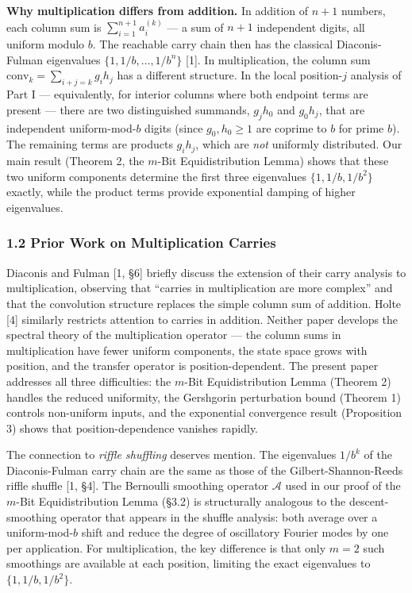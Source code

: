 \documentclass[
  11pt,
]{article}
\begin{document}
\textbf{Why multiplication differs from addition.} In addition of \(n+1\)
numbers, each column sum is \(\sum_{i=1}^{n+1} a_i^{(k)}\) --- a sum of \(n+1\)
independent digits, all uniform modulo \(b\). The reachable carry chain then has
the classical Diaconis-Fulman eigenvalues
\(\lbrace{}1, 1/b, \ldots, 1/b^n\rbrace{}\) {[}1{]}. In multiplication, the
column sum \(\text{conv}_k = \sum_{i+j=k} g_i h_j\) has a different structure.
In the local position-\(j\) analysis of Part I --- equivalently, for interior
columns where both endpoint terms are present --- there are two distinguished
summands, \(g_j h_0\) and \(g_0 h_j\), that are independent uniform-mod-\(b\)
digits (since \(g_0, h_0 \geq 1\) are coprime to \(b\) for prime \(b\)). The
remaining terms are products \(g_i h_j\), which are \emph{not} uniformly
distributed. Our main result (Theorem 2, the \(m\)-Bit Equidistribution Lemma)
shows that these two uniform components determine the first three eigenvalues
\(\lbrace{}1, 1/b, 1/b^2\rbrace{}\) exactly, while the product terms provide
exponential damping of higher eigenvalues.

\subsubsection{1.2 Prior Work on Multiplication
Carries}\label{prior-work-on-multiplication-carries}

Diaconis and Fulman {[}1, §6{]} briefly discuss the extension of their carry
analysis to multiplication, observing that ``carries in multiplication are more
complex'' and that the convolution structure replaces the simple column sum of
addition. Holte {[}4{]} similarly restricts attention to carries in addition.
Neither paper develops the spectral theory of the multiplication operator ---
the column sums in multiplication have fewer uniform components, the state space
grows with position, and the transfer operator is position-dependent. The
present paper addresses all three difficulties: the \(m\)-Bit Equidistribution
Lemma (Theorem 2) handles the reduced uniformity, the Gershgorin perturbation
bound (Theorem 1) controls non-uniform inputs, and the exponential convergence
result (Proposition 3) shows that position-dependence vanishes rapidly.

The connection to \emph{riffle shuffling} deserves mention. The eigenvalues
\(1/b^k\) of the Diaconis-Fulman carry chain are the same as those of the
Gilbert-Shannon-Reeds riffle shuffle {[}1, §4{]}. The Bernoulli smoothing
operator \(\mathcal{A}\) used in our proof of the \(m\)-Bit Equidistribution
Lemma (§3.2) is structurally analogous to the descent-smoothing operator that
appears in the shuffle analysis: both average over a uniform-mod-\(b\) shift and
reduce the degree of oscillatory Fourier modes by one per application. For
multiplication, the key difference is that only \(m = 2\) such smoothings are
available at each position, limiting the exact eigenvalues to
\(\lbrace{}1, 1/b, 1/b^2\rbrace{}\).
\end{document}
